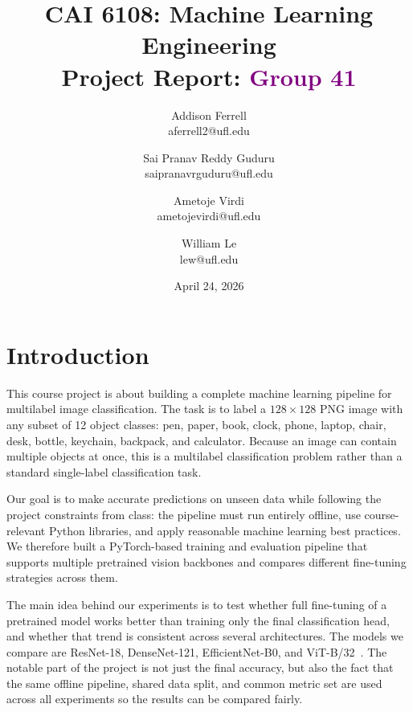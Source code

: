 \documentclass[10pt]{article}
\title{CAI 6108: Machine Learning Engineering\\
	\large Project Report:  {\textcolor{purple}{Group 41}}} %
\author{
        Addison Ferrell \\
        aferrell2@ufl.edu\\
        \and
        Sai Pranav Reddy Guduru \\
        saipranavrguduru@ufl.edu\\
        \and
        Ametoje Virdi \\
        ametojevirdi@ufl.edu\\
        \and
        William Le \\
        lew@ufl.edu\\
}
\date{April 24, 2026}
\begin{document}

\maketitle






\section{Introduction}

This course project is about building a complete machine learning pipeline for
multilabel image classification. The task is to label a $128\times128$ PNG
image with any subset of 12 object classes: pen, paper, book, clock, phone,
laptop, chair, desk, bottle, keychain, backpack, and calculator. Because an
image can contain multiple objects at once, this is a multilabel classification
problem rather than a standard single-label classification task.

Our goal is to make accurate predictions on unseen data while following the
project constraints from class: the pipeline must run entirely offline, use
course-relevant Python libraries, and apply reasonable machine learning best
practices. We therefore built a PyTorch-based training and evaluation pipeline
that supports multiple pretrained vision backbones and compares different
fine-tuning strategies across them.

The main idea behind our experiments is to test whether full fine-tuning of a
pretrained model works better than training only the final classification head,
and whether that trend is consistent across several architectures. The models
we compare are ResNet-18, DenseNet-121, EfficientNet-B0, and
ViT-B/32~\cite{he2016deep,huang2017densely,tan2019efficientnet,dosovitskiy2021image}.
The notable part of the project is not just the final accuracy, but also the
fact that the same offline pipeline, shared data split, and common metric set
are used across all experiments so the results can be compared fairly.
\end{document}
